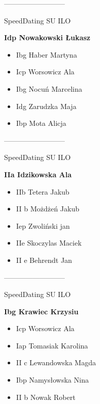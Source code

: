 \documentclass[a4paper,10pt]{article}
\begin{document}
\begin{multicols}{3}
\begin{minipage}[l]{\textwidth}
\end{minipage}



\begin{minipage}[l]{\textwidth}
--------------------------

  \footnotesize{SpeedDating SU ILO}

  \bfseries{Idp Nowakowski Łukasz}

  \begin{itemize}
    \item Ibg Haber Martyna
    \item Icp Worsowicz Ala
    \item Ibg Nocuń Marcelina
    \item Idg Zarudzka Maja
    \item Ibp Mota Alicja

    \end{itemize}



\end{minipage}



\begin{minipage}[l]{\textwidth}
--------------------------

  \footnotesize{SpeedDating SU ILO}

  \bfseries{IIa Idzikowska Ala}

  \begin{itemize}
    \item IIb Tetera Jakub
    \item II b Możdżeń Jakub
    \item Iep Zwoliński jan
    \item IIe Skoczylas Maciek
    \item II e Behrendt Jan

    \end{itemize}



\end{minipage}



\begin{minipage}[l]{\textwidth}
--------------------------

  \footnotesize{SpeedDating SU ILO}

  \bfseries{Ibg Krawiec Krzysiu}

  \begin{itemize}
    \item Icp Worsowicz Ala
    \item Iap Tomasiak Karolina
    \item II c Lewandowska Magda
    \item Ibp Namysłowska Nina
    \item II b Nowak Robert


\end{itemize}
\end{minipage}
\end{multicols}
\end{document}

